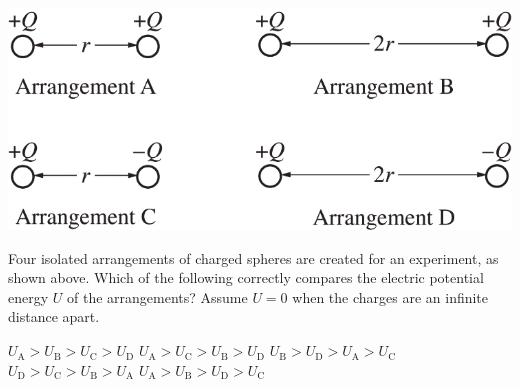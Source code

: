 
\begin{center}
    \includegraphics[scale=0.3]{images/img-004-003.png}
\end{center}

\begin{questions}
\setcounter{question}{5}

\question
Four isolated arrangements of charged spheres are created for an experiment, as shown above. Which of the following correctly compares the electric potential energy $U$ of the arrangements? Assume $U=0$ when the charges are an infinite distance apart.

\begin{choices}
    \choice $U_{\mathrm{A}} > U_{\mathrm{B}} > U_{\mathrm{C}} > U_{\mathrm{D}}$
    \choice $U_{\mathrm{A}} > U_{\mathrm{C}} > U_{\mathrm{B}} > U_{\mathrm{D}}$
    \choice $U_{\mathrm{B}} > U_{\mathrm{D}} > U_{\mathrm{A}} > U_{\mathrm{C}}$
    \choice $U_{\mathrm{D}} > U_{\mathrm{C}} > U_{\mathrm{B}} > U_{\mathrm{A}}$
    \choice $U_{\mathrm{A}} > U_{\mathrm{B}} > U_{\mathrm{D}} > U_{\mathrm{C}}$
\end{choices}

\end{questions}
